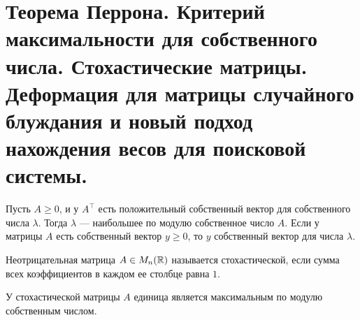 \section{Теорема Перрона. Критерий максимальности для собственного числа. Стохастические матрицы. Деформация для матрицы случайного блуждания и новый подход нахождения весов для поисковой системы.}
\begin{st}
    Пусть $ A \ge 0$, и у $ A^{\top}$ есть положительный собственный вектор для собственного числа $ \lambda $. Тогда $ \lambda  $ --- наибольшее по модулю собственное число $ A$. Если у матрицы  $ A$ есть собственный вектор  $ y \ge  0$, то  $ y$ собственный вектор для числа  $ \lambda $.
\end{st}
\begin{defn}
    Неотрицательная матрица $ A \in M_{n}(\mathbb{R})$ называется {\sf стохастической}, если сумма всех коэффициентов в каждом ее столбце равна $ 1$.
\end{defn}
\begin{cor}
    У стохастической матрицы $ A$ единица является максимальным по модулю собственным числом.
\end{cor}

